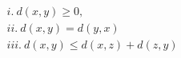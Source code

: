 \documentclass[preview]{standalone}
\begin{document}
\begin{align*}
& i. \ d(x,y) \geq  0,  \\& ii. \  d(x,y)=d(y,x) \\& iii. \ d(x,y) \leq d(x,z) + d(z,y) \\&
\end{align*}
\end{document}
